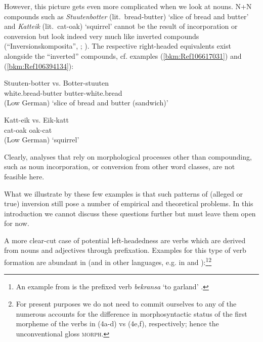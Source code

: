 \documentclass[output=paper
  ,nobabel
  ,draftmode
  ,colorlinks, citecolor=brown
]{langscibook}
\begin{document}
\begin{itemize}
\end{itemize}



However, this picture gets even more complicated when we look at nouns. N+N compounds such as
\emph{Stuutenbotter} (lit.\ bread-butter) `slice of bread and butter' and \emph{Katteik}
(lit.\ cat-oak) `squirrel' cannot be the result of incorporation or conversion but look indeed very
much like inverted compounds (``Inversionskomposita'', \citealt[61–62]{OrtnerOrtner1984};
\citealt{Olsen2015a}). The respective right-headed equivalents exist alongside the “inverted''
compounds, cf. examples (\ref{bkm:Ref106617031}) and (\ref{bkm:Ref106394134}):

\ea
\label{bkm:Ref106617031}
\gll Stuuten-botter     vs.     Botter-stuuten\\
     white.bread-butter {}  butter-white.bread\\\hfill(Low German)
\glt   `slice of bread and butter (sandwich)'
\z

\ea
\label{bkm:Ref106394134}
\gll   Katt-eik   vs.   Eik-katt\\
       cat-oak    {}   oak-cat \\\hfill(Low German)
\glt   `squirrel'
\z

\noindent
Clearly, analyses that rely on morphological processes other than compounding, such as noun
incorporation, or conversion from other word classes, are not feasible here.

What we illustrate by these few examples is that such patterns of (alleged or true) inversion still
pose a number of empirical and theoretical problems. In this introduction we cannot discuss these
questions further but must leave them open for now.

A more clear-cut case of potential left-headedness are verbs which are derived from nouns and
adjectives through prefixation. Examples for this type of verb formation are abundant in  (and
in other  languages, e.g. in  and ):\footnote{An example from  is the
  prefixed verb \emph{bekransa} `to garland' \citep[90]{Schmidt1996}.}\footnote{For present purposes we do not need to commit ourselves to any of the numerous accounts for the difference in morphosyntactic status of the first morpheme of the verbs in (4a-d) vs (4e,f), respectively; hence the unconventional gloss \textsc{morph}.}
\end{document}
